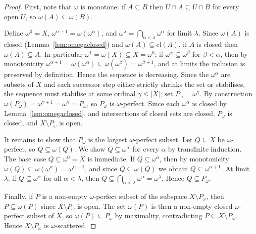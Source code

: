 \documentclass[submission,copyright,creativecommons]{eptcs}
\newcommand{\cl}{\mathrm{cl}}
\begin{document}
\begin{proof}
First, note that $\omega$ is monotone: if $A \subseteq B$ then $U \cap A \subseteq U \cap B$ for every open $U$, so $\omega(A) \subseteq \omega(B)$.

Define $\omega^0 = X$, $\omega^{\alpha+1} = \omega(\omega^\alpha)$, and $\omega^\lambda = \bigcap_{\alpha < \lambda} \omega^\alpha$ for limit $\lambda$.
Since $\omega(A)$ is closed (Lemma~\ref{lem:omegaclosed}) and $\omega(A) \subseteq \cl(A)$, if $A$ is closed then $\omega(A) \subseteq A$.
In particular $\omega^1 = \omega(X) \subseteq X = \omega^0$; if $\omega^\alpha \subseteq \omega^\beta$ for $\beta < \alpha$, then by monotonicity $\omega^{\alpha+1} = \omega(\omega^\alpha) \subseteq \omega(\omega^\beta) = \omega^{\beta+1}$, and at limits the inclusion is preserved by definition.
Hence the sequence is decreasing.
Since the $\omega^\alpha$ are subsets of $X$ and each successor step either strictly shrinks the set or stabilises, the sequence must stabilise at some ordinal $\gamma \leq |X|$; set $P_\omega = \omega^\gamma$.
By construction $\omega(P_\omega) = \omega^{\gamma+1} = \omega^\gamma = P_\omega$, so $P_\omega$ is $\omega$-perfect.
Since each $\omega^\alpha$ is closed by Lemma~\ref{lem:omegaclosed}, and intersections of closed sets are closed, $P_\omega$ is closed, and $X \setminus P_\omega$ is open.

It remains to show that $P_\omega$ is the largest $\omega$-perfect subset.
Let $Q \subseteq X$ be $\omega$-perfect, so $Q \subseteq \omega(Q)$.
We show $Q \subseteq \omega^\alpha$ for every $\alpha$ by transfinite induction.
The base case $Q \subseteq \omega^0 = X$ is immediate.
If $Q \subseteq \omega^\alpha$, then by monotonicity $\omega(Q) \subseteq \omega(\omega^\alpha) = \omega^{\alpha+1}$, and since $Q \subseteq \omega(Q)$ we obtain $Q \subseteq \omega^{\alpha+1}$.
At limit $\lambda$, if $Q \subseteq \omega^\alpha$ for all $\alpha < \lambda$, then $Q \subseteq \bigcap_{\alpha < \lambda} \omega^\alpha = \omega^\lambda$.
Hence $Q \subseteq P_\omega$.

Finally, if $P$ is a non-empty $\omega$-perfect subset of the subspace $X \setminus P_\omega$, then $P \subseteq \omega(P)$ since $X \setminus P_\omega$ is open.
The set $\omega(P)$ is then a non-empty closed $\omega$-perfect subset of $X$, so $\omega(P) \subseteq P_\omega$ by maximality, contradicting $P \subseteq X \setminus P_\omega$.
Hence $X \setminus P_\omega$ is $\omega$-scattered.
\end{proof}
\end{document}

